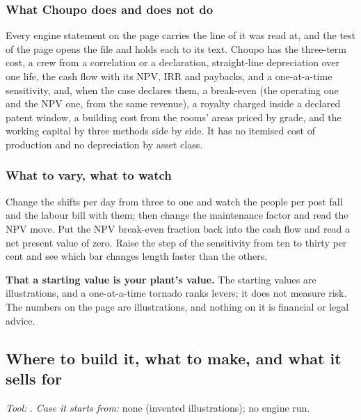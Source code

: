 \documentclass[11pt,a4paper]{article}
\begin{document}
\subsubsection*{What Choupo does and does not do}

Every engine statement on the page carries the line of
 it was read at, and the test of the page opens the
file and holds each to its text.  Choupo has the three-term cost, a crew from
a correlation or a declaration, straight-line depreciation over one life, the
cash flow with its NPV, IRR and paybacks, and a one-at-a-time sensitivity,
and, when the case declares them, a break-even (the operating one and the NPV
one, from the same revenue), a royalty charged inside a declared patent
window, a building cost from the rooms' areas priced by grade, and the
working capital by three methods side by side.  It has no itemised cost of
production and no depreciation by asset class.

\subsubsection*{What to vary, what to watch}

\begin{tryit}
Change the shifts per day from three to one and watch the people per post
fall and the labour bill with them; then change the maintenance factor and read
the NPV move.  Put the NPV break-even fraction back into the
cash flow and read a net present value of zero.  Raise the step of the
sensitivity from ten to thirty per cent and see which bar changes length
faster than the others.
\end{tryit}

\begin{pitfall}
\textbf{That a starting value is your plant's value.}  The starting values
are illustrations, and a one-at-a-time tornado ranks levers;
it does not measure risk.  The numbers on the page are illustrations, and
nothing on it is financial or legal advice.
\end{pitfall}

\subsection{Where to build it, what to make, and what it sells for}\label{sec:edu-site-process-price}


\noindent\textit{\small Tool:} .  \textit{\small
Case it starts from:} none (invented illustrations); no engine run.
\end{document}
